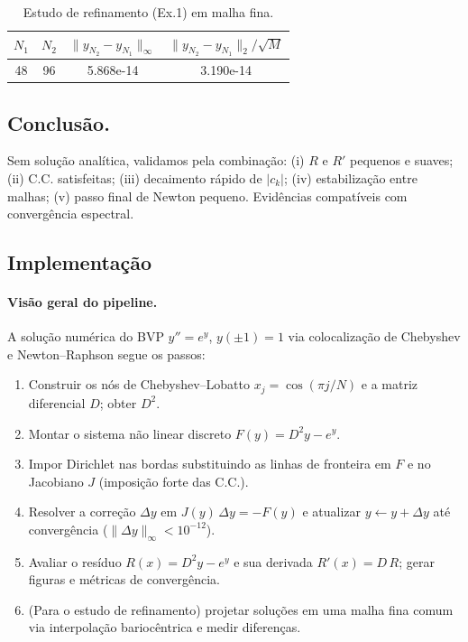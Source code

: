 \documentclass[12pt,a4paper]{article}
\begin{document}
\begin{table}[H]
\centering
\caption{Estudo de refinamento (Ex.1) em malha fina.}
\label{tab:ex1_refine}
\begin{tabular}{c c c c}
\hline
$N_1$ & $N_2$ & $\|y_{N_2}-y_{N_1}\|_{\infty}$ & $\|y_{N_2}-y_{N_1}\|_{2}/\sqrt{M}$ \\
\hline
48 & 96 & 5.868e-14 & 3.190e-14 \\
\hline
\end{tabular}
\end{table}

\subsection{Conclusão.}
Sem solução analítica, validamos pela combinação: (i) \(R\) e \(R'\) pequenos e suaves; (ii) C.C. satisfeitas; (iii) decaimento rápido de \(|c_k|\); (iv) estabilização entre malhas; (v) passo final de Newton pequeno. Evidências compatíveis com convergência espectral.

\subsection{Implementação}
\label{subsec:ex1-implementacao}

\paragraph{Visão geral do pipeline.}
A solução numérica do BVP
\(y'' = e^{y}\), \(y(\pm1)=1\)
via colocalização de Chebyshev e Newton–Raphson segue os passos:
\begin{enumerate}
    \item Construir os nós de Chebyshev–Lobatto \(x_j=\cos(\pi j/N)\) e a matriz diferencial \(D\); obter \(D^2\).
    \item Montar o sistema não linear discreto \(F(y)=D^2y - e^{y}\).
    \item Impor Dirichlet nas bordas substituindo as linhas de fronteira em \(F\) e no Jacobiano \(J\) (imposição forte das C.C.).
    \item Resolver a correção \(\Delta y\) em \(J(y)\,\Delta y = -F(y)\) e atualizar \(y \leftarrow y + \Delta y\) até convergência (\(\|\Delta y\|_\infty<10^{-12}\)).
    \item Avaliar o resíduo \(R(x)=D^2y-e^{y}\) e sua derivada \(R'(x)=D\,R\); gerar figuras e métricas de convergência.
    \item (Para o estudo de refinamento) projetar soluções em uma malha fina comum via interpolação bariocêntrica e medir diferenças.
\end{enumerate}
\end{document}
